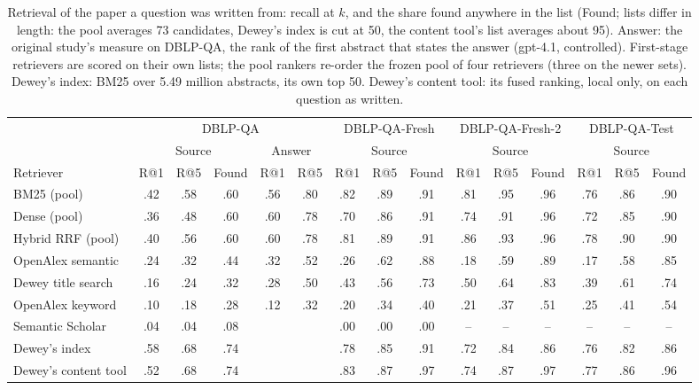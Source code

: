 \documentclass[conference]{IEEEtran}
\newcommand{\dq}{DBLP-QA}
\newcommand{\fresh}{DBLP-QA-Fresh}
\newcommand{\freshb}{DBLP-QA-Fresh-2}
\newcommand{\test}{DBLP-QA-Test}
\begin{document}
\begin{table}[t]
\caption{Retrieval of the paper a question was written from: recall at $k$, and the share found anywhere
in the list (Found; lists differ in length: the pool averages 73 candidates, Dewey's index is cut at 50,
the content tool's list averages about 95). Answer: the original study's measure on \dq{}, the rank of the first abstract that
states the answer (gpt-4.1, controlled). First-stage retrievers are scored on their own lists; the pool
rankers re-order the frozen pool of four retrievers (three on the newer sets). Dewey's index: BM25 over
5.49 million abstracts, its own top 50. Dewey's content tool: its fused ranking, local only, on each
question as written.}
\label{tab:retrieval}
\centering\footnotesize
\setlength{\tabcolsep}{2.8pt}
\begin{tabular}{l*{14}{c}}
\toprule
 & \multicolumn{5}{c}{\dq{}} & \multicolumn{3}{c}{\fresh{}} & \multicolumn{3}{c}{\freshb{}} & \multicolumn{3}{c}{\test{}} \\
\cmidrule(lr){2-6}\cmidrule(lr){7-9}\cmidrule(lr){10-12}\cmidrule(lr){13-15}
 & \multicolumn{3}{c}{Source} & \multicolumn{2}{c}{Answer} & \multicolumn{3}{c}{Source} & \multicolumn{3}{c}{Source} & \multicolumn{3}{c}{Source} \\
\cmidrule(lr){2-4}\cmidrule(lr){5-6}
Retriever & R@1 & R@5 & Found & R@1 & R@5 & R@1 & R@5 & Found & R@1 & R@5 & Found & R@1 & R@5 & Found \\
\midrule
BM25 (pool) & .42 & .58 & .60 & .56 & .80 & .82 & .89 & .91 & .81 & .95 & .96 & .76 & .86 & .90 \\
Dense (pool) & .36 & .48 & .60 & .60 & .78 & .70 & .86 & .91 & .74 & .91 & .96 & .72 & .85 & .90 \\
Hybrid RRF (pool) & .40 & .56 & .60 & .60 & .78 & .81 & .89 & .91 & .86 & .93 & .96 & .78 & .90 & .90 \\
\midrule
OpenAlex semantic & .24 & .32 & .44 & .32 & .52 & .26 & .62 & .88 & .18 & .59 & .89 & .17 & .58 & .85 \\
Dewey title search & .16 & .24 & .32 & .28 & .50 & .43 & .56 & .73 & .50 & .64 & .83 & .39 & .61 & .74 \\
OpenAlex keyword & .10 & .18 & .28 & .12 & .32 & .20 & .34 & .40 & .21 & .37 & .51 & .25 & .41 & .54 \\
Semantic Scholar & .04 & .04 & .08 & & & .00 & .00 & .00 & -- & -- & -- & -- & -- & -- \\
\midrule
Dewey's index & .58 & .68 & .74 & & & .78 & .85 & .91 & .72 & .84 & .86 & .76 & .82 & .86 \\
Dewey's content tool & .52 & .68 & .74 & & & .83 & .87 & .97 & .74 & .87 & .97 & .77 & .86 & .96 \\
\bottomrule
\end{tabular}
\end{table}
\end{document}
